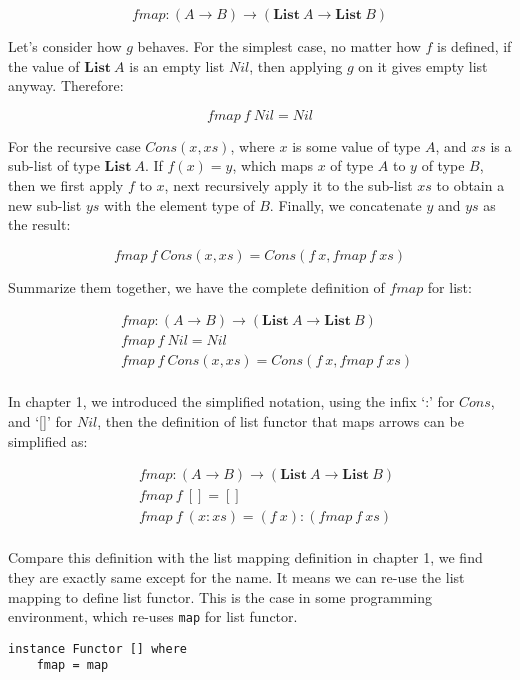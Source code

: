 \documentclass{article}
\begin{document}
\begin{example}
\[
fmap: (A \to B) \to (\mathbf{List}\ A \to \mathbf{List}\ B)
\]

Let's consider how $g$ behaves. For the simplest case, no matter how $f$ is defined, if the value of $\mathbf{List}\ A$ is an empty list $Nil$, then applying $g$ on it gives empty list anyway. Therefore:

\[
fmap\ f\ Nil = Nil
\]

For the recursive case $Cons(x, xs)$, where $x$ is some value of type $A$, and $xs$ is a sub-list of type $\mathbf{List}\ A$. If $f(x) = y$, which maps $x$ of type $A$ to $y$ of type $B$, then we first apply $f$ to $x$, next recursively apply it to the sub-list $xs$ to obtain a new sub-list $ys$ with the element type of $B$. Finally, we concatenate $y$ and $ys$ as the result:

\[
fmap\ f\ Cons(x, xs) = Cons(f\ x, fmap\ f\ xs)
\]

Summarize them together, we have the complete definition of $fmap$ for list:

\[
\begin{array}{l}
\quad    fmap : (A \to B) \to (\mathbf{List}\ A \to \mathbf{List}\ B) \\
\quad    fmap\ f\ Nil = Nil \\
\quad    fmap\ f\ Cons(x, xs) = Cons(f\ x, fmap\ f\ xs) \\
\end{array}
\]

In chapter 1, we introduced the simplified notation, using the infix `:' for $Cons$, and `[]' for $Nil$, then the definition of list functor that maps arrows can be simplified as:

\[
\begin{array}{l}
\quad    fmap : (A \to B) \to (\mathbf{List}\ A \to \mathbf{List}\ B) \\
\quad    fmap\ f\ [] = [] \\
\quad    fmap\ f\ (x:xs) = (f\ x):(fmap\ f\ xs) \\
\end{array}
\]

Compare this definition with the list mapping definition in chapter 1, we find they are exactly same except for the name. It means we can re-use the list mapping to define list functor. This is the case in some programming environment, which re-uses \texttt{map} for list functor.

\lstset{frame=single}
\begin{lstlisting}
instance Functor [] where
    fmap = map
\end{lstlisting}


\end{example}
\end{document}
